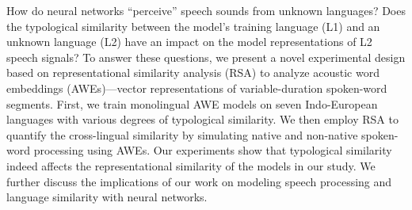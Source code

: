 How do neural networks ``perceive'' speech sounds from unknown languages? Does the typological similarity between the model's training language (L1) and an unknown language (L2) have an impact on the model representations of L2 speech signals? To answer these questions, we present a novel experimental design based on representational similarity analysis (RSA) to analyze acoustic word embeddings (AWEs)---vector representations of variable-duration spoken-word segments. First, we train monolingual AWE models on seven Indo-European languages with various degrees of typological similarity. We then employ RSA to quantify the cross-lingual similarity by simulating native and non-native spoken-word processing using AWEs. Our experiments show that typological similarity indeed affects the representational similarity of the models in our study. We further discuss the implications of our work on modeling speech processing and language similarity with neural networks.
